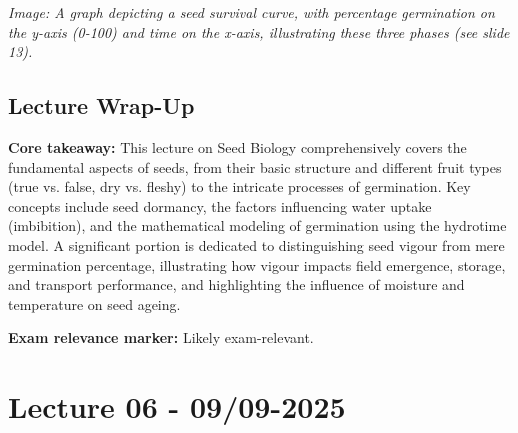 \textit{Image: A graph depicting a seed survival curve, with percentage germination on the y-axis (0-100) and time on the x-axis, illustrating these three phases (see slide 13).}


\subsection*{Lecture Wrap-Up} 
\textbf{Core takeaway:} This lecture on Seed Biology comprehensively covers the fundamental aspects of seeds, from their basic structure and different fruit types (true vs. false, dry vs. fleshy) to the intricate processes of germination. Key concepts include seed dormancy, the factors influencing water uptake (imbibition), and the mathematical modeling of germination using the hydrotime model. A significant portion is dedicated to distinguishing seed vigour from mere germination percentage, illustrating how vigour impacts field emergence, storage, and transport performance, and highlighting the influence of moisture and temperature on seed ageing. 

\vspace{1em} 
\textbf{Exam relevance marker:} Likely exam-relevant.

\section{Lecture 06 - 09/09-2025}

